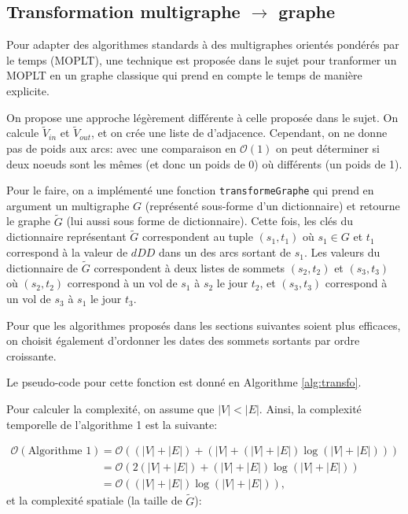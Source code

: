 \subsection{Transformation multigraphe $\rightarrow$ graphe}
\label{sec:transfo}

Pour adapter des algorithmes standards à des multigraphes orientés pondérés par
le temps (MOPLT), une technique est proposée dans le sujet pour tranformer un
MOPLT en un graphe classique qui prend en compte le temps de manière explicite.

On propose une approche légèrement différente à celle proposée dans le sujet. On
calcule $\tilde{V}_{in}$ et $\tilde{V}_{out}$, et on crée une liste de
d'adjacence. Cependant, on ne donne pas de poids aux arcs: avec une comparaison
en $\mathcal{O}(1)$ on peut déterminer si deux noeuds sont les mêmes (et donc un
poids de 0) où différents (un poids de 1).

Pour le faire, on a implémenté une fonction \verb|transformeGraphe| qui prend en
argument un multigraphe $G$ (représenté sous-forme d'un dictionnaire) et
retourne le graphe $\tilde{G}$ (lui aussi sous forme de dictionnaire). Cette
fois, les clés du dictionnaire représentant $\tilde{G}$ correspondent au tuple
$(s_1,t_1)$ où $s_1 \in G$ et $t_1$ correspond à la valeur de $dDD$ dans un des
arcs sortant de $s_1$. Les valeurs du dictionnaire de $\tilde{G}$ correspondent
à deux listes de sommets $(s_2,t_2)$ et $(s_3,t_3)$ où $(s_2,t_2)$ correspond à
un vol de $s_1$ à $s_2$ le jour $t_2$, et $(s_3,t_3)$ correspond à un vol de
$s_3$ à $s_1$ le jour $t_3$.

Pour que les algorithmes proposés dans les sections suivantes soient plus
efficaces, on choisit également d'ordonner les dates des sommets sortants par
ordre croissante.

Le pseudo-code pour cette fonction est donné en Algorithme \ref{alg:transfo}.


Pour calculer la complexité, on assume que $|V| < |E|$. Ainsi, la complexité
temporelle de l'algorithme 1 est la suivante:

\begin{equation}
\begin{align}
  \mathcal{O}(\text{Algorithme 1}) & = \mathcal{O}((|V| + |E|) + (|V| + (|V|+|E|) \log (|V| + |E|))) \\
                                   & = \mathcal{O}(2(|V| + |E|) + (|V|+|E|)\log(|V|+|E|)) \\
                                   & = \mathcal{O}((|V| + |E|)\log(|V|+|E|))\text{,}
\end{align}
\label{eq:8}
\end{equation}
et la complexité spatiale (la taille de $\tilde{G}$):

